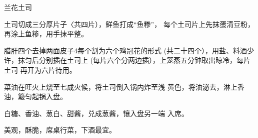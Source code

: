 \begin{recipe}{兰花土司}

\ingredients


\cooking

土司切成三分厚片子〈共四片），鲜鱼打成“鱼糁”， 每个土司片上先抹蛋清豆粉，再涂上鱼糁，用手抹平整。

\step 腊肝四个去掉两面皮子4每个割为六个鸡冠花的形式 (共二十四个），用盐、料酒少许，抹匀后分别插在土司上 (每片六个分两边插），上笼蒸五分钟取出晾冷，每片土司 再开为六片待用。

菜油在旺火上烧至七成火候，将土司倒入锅内炸至浅 黄色，将油泌去，淋上香油，簸匀起锅入盘。

\step 白糖、香油、葱白、甜酱，兑成葱酱，镶入盘另一端 入席。

\notes

美观，酥脆，席桌行菜，下酒最宜。

\end{recipe}

